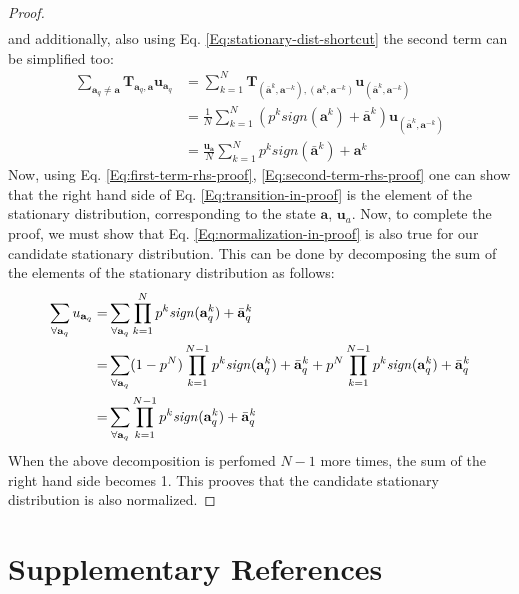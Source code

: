 \documentclass[11pt]{article}
\theoremstyle{plainCl1}
\theoremstyle{plainCl2}
\newcommand{\abf}{\mathbf{a}}
\newcommand{\T}{\mathbf{T}}
\newcommand{\ubf}{\mathbf{u}}
\begin{document}
\begin{proof}
\begin{eqnarray}
\end{eqnarray} 
and additionally, also using Eq. \ref{Eq:stationary-dist-shortcut} the second term can be simplified too:
\begin{align}
\sum_{\abf_q \neq \abf} \T_{\abf_q, \abf} \ubf_{\abf_q} &= \sum_{k = 1}^N \T_{(\bar{\abf}^k,\abf^{-k}), (\abf^k, \abf^{-k})} \ubf_{(\bar{\abf}^k,\abf^{-k})} \\
&= \frac{1}{N} \sum_{k = 1}^N \left(p^k \textit{sign}(\abf^k) + \bar{\abf}^k \right) \ubf_{(\bar{\abf}^k,\abf^{-k})} \\ 
\label{Eq:second-term-rhs-proof}
&= \frac{\ubf_\abf}{N} \sum_{k=1}^{N} p^k \textit{sign}(\bar{\abf}^k) + \abf^k 
\end{align}
Now, using Eq. \ref{Eq:first-term-rhs-proof}, \ref{Eq:second-term-rhs-proof} one can show that the right hand side of Eq. \ref{Eq:transition-in-proof} is the element of the stationary distribution, corresponding to the state $\abf$, $\ubf_a$.  Now, to complete the proof, we must show that Eq. \ref{Eq:normalization-in-proof} is also true for our candidate stationary distribution. This can be done by decomposing the sum of the elements of the stationary distribution as follows:
\begin{eqnarray}
\sum_{\forall \abf_q} u_{\abf_q} =& \displaystyle \sum_{\forall \abf_q} \prod_{k=1}^N p^k \mathit{sign}(\abf_q^k) + \bar{\abf}_q^k \\
=& \displaystyle \displaystyle \sum_{\forall \abf_q} (1-p^N)  \prod_{k=1}^{N-1} p^k \mathit{sign}(\abf_q^k) + \bar{\abf}_q^k  + p^N  \prod_{k=1}^{N-1} p^k \mathit{sign}(\abf_q^k) + \bar{\abf}_q^k \\ 
=& \displaystyle \sum_{\forall \abf_q} \prod_{k=1}^{N-1} p^k \mathit{sign}(\abf_q^k) + \bar{\abf}_q^k
\end{eqnarray}
When the above decomposition is perfomed $N-1$ more times, the sum of the right hand side becomes 1. This prooves that the candidate stationary distribution is also normalized. 
\end{proof}


\section*{Supplementary References}


\end{document}
